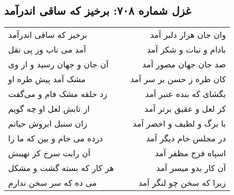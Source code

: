 \begin{center}
\section*{غزل شماره ۷۰۸: برخیز که ساقی اندرآمد}
\label{sec:0708}
\begin{longtable}{l p{0.5cm} r}
برخیز که ساقی اندرآمد
&&
وان جان هزار دلبر آمد
\\
آمد می ناب وز پی نقل
&&
بادام و نبات و شکر آمد
\\
آن جان و جهان رسید و از وی
&&
صد جان جهان مصور آمد
\\
مشک آمد پیش طره او
&&
کان طره ز حسن بر سر آمد
\\
زد حلقه مشک فام و می‌گفت
&&
بگشای که بنده عنبر آمد
\\
از تابش لعل او چه گویم
&&
کز لعل و عقیق برتر آمد
\\
زان سنبل ابروش حیاتم
&&
با برگ و لطیف و اخضر آمد
\\
درده می خام و بین که ما را
&&
در مجلس خام دیگر آمد
\\
آن رایت سرخ کز نهیبش
&&
اسپاه فرج مظفر آمد
\\
هر کار که بسته گشت و مشکل
&&
آن کار بدو میسر آمد
\\
می ده که سر سخن ندارم
&&
زیرا که سخن چو لنگر آمد
\\
\end{longtable}
\end{center}
